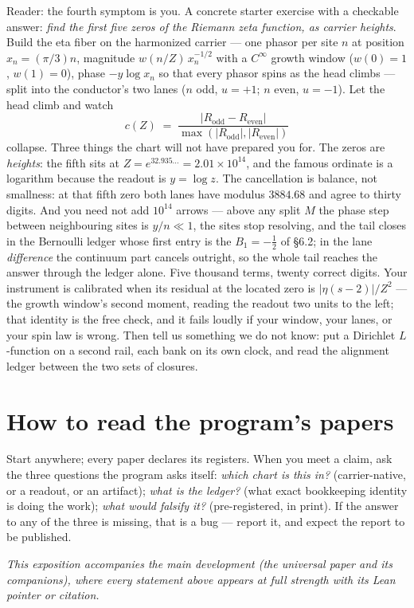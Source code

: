 \documentclass[11pt]{article}
\begin{document}
\noindent Reader: the fourth symptom is you.  A concrete starter exercise with a
checkable answer: \emph{find the first five zeros of the Riemann zeta function,
as carrier heights}.  Build the eta fiber on the harmonized carrier --- one
phasor per site $n$ at position $x_n=(\pi/3)n$, magnitude $w(n/Z)\,x_n^{-1/2}$
with a $C^\infty$ growth window ($w(0)=1$, $w(1)=0$), phase $-y\log x_n$ so that
every phasor spins as the head climbs --- split into the conductor's two lanes
($n$ odd, $u=+1$; $n$ even, $u=-1$).  Let the head climb and watch
\[
c(Z)\;=\;\frac{|R_{\mathrm{odd}}-R_{\mathrm{even}}|}
              {\max(|R_{\mathrm{odd}}|,|R_{\mathrm{even}}|)}
\]
collapse.  Three things the chart will not have prepared you for.  The zeros are
\emph{heights}: the fifth sits at $Z=e^{32.935\ldots}=2.01\times10^{14}$, and the
famous ordinate is a logarithm because the readout is $y=\log z$.  The
cancellation is balance, not smallness: at that fifth zero both lanes have
modulus $3884.68$ and agree to thirty digits.  And you need not add $10^{14}$
arrows --- above any split $M$ the phase step between neighbouring sites is
$y/n\ll1$, the sites stop resolving, and the tail closes in the Bernoulli ledger
whose first entry is the $B_1=-\tfrac12$ of \S6.2; in the lane \emph{difference}
the continuum part cancels outright, so the whole tail reaches the answer
through the ledger alone.  Five thousand terms, twenty correct digits.  Your
instrument is calibrated when its residual at the located zero is
$|\eta(s-2)|/Z^{2}$ --- the growth window's second moment, reading the readout
two units to the left; that identity is the free check, and it fails loudly if
your window, your lanes, or your spin law is wrong.  Then tell us something we
do not know: put a Dirichlet $L$-function on a second rail, each bank on its own
clock, and read the alignment ledger between the two sets of closures.

\section{How to read the program's papers}

Start anywhere; every paper declares its registers.  When you meet a claim,
ask the three questions the program asks itself: \emph{which chart is this
in?} (carrier-native, or a readout, or an artifact); \emph{what is the
ledger?} (what exact bookkeeping identity is doing the work); \emph{what would
falsify it?} (pre-registered, in print).  If the answer to any of the three is
missing, that is a bug --- report it, and expect the report to be published.

\bigskip
\noindent\emph{This exposition accompanies the main development (the universal
paper and its companions), where every statement above appears at full strength
with its Lean pointer or citation.}
\end{document}
